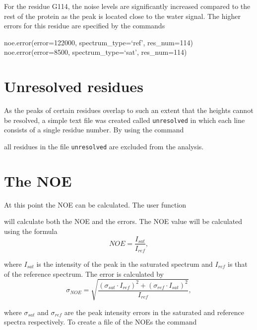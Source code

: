 For the residue G114, the noise levels are significantly increased compared to the rest of the protein as the peak is located close to the water signal.  The higher errors for this residue are specified by the commands

\begin{exampleenv}
noe.error(error=122000, spectrum\_type=`ref', res\_num=114) \\
noe.error(error=8500, spectrum\_type=`sat', res\_num=114)
\end{exampleenv}




\section{Unresolved residues}

As the peaks of certain residues overlap to such an extent that the heights cannot be resolved, a simple text file was created called \texttt{unresolved} in which each line consists of a single residue number.  By using the command


all residues in the file \texttt{unresolved} are excluded from the analysis.




\section{The NOE}

At this point the NOE can be calculated.  The user function


will calculate both the NOE and the errors.  The NOE value will be calculated using the formula
\begin{equation}
NOE = \frac{I_{sat}}{I_{ref}},
\end{equation}

\noindent where $I_{sat}$ is the intensity of the peak in the saturated spectrum and $I_{ref}$ is that of the reference spectrum.  The error is calculated by
\begin{equation}
\sigma_{NOE} = \sqrt{\frac{(\sigma_{sat} \cdot I_{ref})^2 + (\sigma_{ref} \cdot I_{sat})^2}{I_{ref}}},
\end{equation}

\noindent where $\sigma_{sat}$ and $\sigma_{ref}$ are the peak intensity errors in the saturated and reference spectra respectively.  To create a file of the NOEs the command

